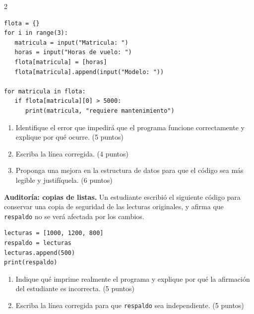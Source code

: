 \documentclass[addpoints,10pt]{exam}
\begin{document}
\begin{multicols}{2}
\begin{questions}
\begin{lstlisting}
flota = {}
for i in range(3):
   matricula = input("Matricula: ")
   horas = input("Horas de vuelo: ")
   flota[matricula] = [horas]
   flota[matricula].append(input("Modelo: "))

for matricula in flota:
   if flota[matricula][0] > 5000:
      print(matricula, "requiere mantenimiento")
\end{lstlisting}
			
			\begin{enumerate}
				\item Identifique el error que impedirá que el programa funcione correctamente y explique por qué ocurre. (5 puntos)
				\item Escriba la línea corregida. (4 puntos)
				\item Proponga una mejora en la estructura de datos para que el código sea más legible y justifíquela. (6 puntos)
			\end{enumerate}
			
			\makeemptybox{5cm}
			
			\question[10]
			\textbf{Auditoría: copias de listas.} Un estudiante escribió el siguiente código para conservar una copia de seguridad de las lecturas originales, y afirma que \texttt{respaldo} no se verá afectada por los cambios.
			
\begin{lstlisting}
lecturas = [1000, 1200, 800]
respaldo = lecturas
lecturas.append(500)
print(respaldo)
\end{lstlisting}
			
			\begin{enumerate}
				\item Indique qué imprime realmente el programa y explique por qué la afirmación del estudiante es incorrecta. (5 puntos)
				\item Escriba la línea corregida para que \texttt{respaldo} sea independiente. (5 puntos)
			\end{enumerate}
			
			\makeemptybox{3.5cm}
		
		\end{questions}
	\end{multicols}
	
	
\end{document}
